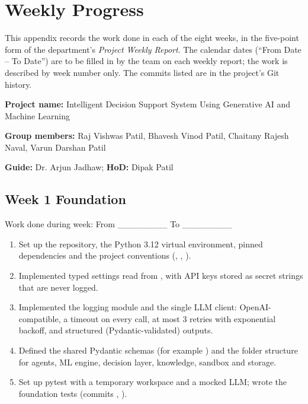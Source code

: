 \chapter{Weekly Progress}\label{ch:B}

This appendix records the work done in each of the eight weeks, in the five-point form of the department's \textit{Project Weekly Report}. The calendar dates (``From Date -- To Date'') are to be filled in by the team on each weekly report; the work is described by week number only. The commits listed are in the project's Git history.

\textbf{Project name:} Intelligent Decision Support System Using Generative AI and Machine Learning

\textbf{Group members:} Raj Vishwas Patil, Bhavesh Vinod Patil, Chaitany Rajesh Naval, Varun Darshan Patil

\textbf{Guide:} Dr. Arjun Jadhaw; \textbf{HoD:} Dipak Patil

\FloatBarrier
\setcounter{secnumdepth}{0}
\section{Week 1 \textemdash{} Foundation}
\setcounter{secnumdepth}{2}

Work done during week: From \_\_\_\_\_\_\_\_ To \_\_\_\_\_\_\_\_

\begin{enumerate}
  \item Set up the repository, the Python 3.12 virtual environment, pinned dependencies and the project conventions (, , ).
  \item Implemented typed settings read from , with API keys stored as secret strings that are never logged.
  \item Implemented the logging module and the single LLM client: OpenAI-compatible, a timeout on every call, at most 3 retries with exponential backoff, and structured (Pydantic-validated) outputs.
  \item Defined the shared Pydantic schemas (for example ) and the folder structure for agents, ML engine, decision layer, knowledge, sandbox and storage.
  \item Set up pytest with a temporary workspace and a mocked LLM; wrote the foundation tests (commits , ).
\end{enumerate}

